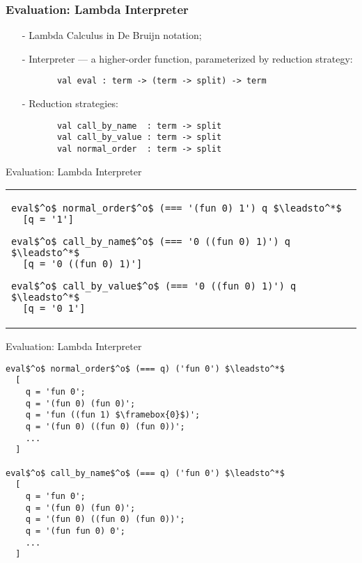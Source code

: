 \documentclass{beamer}
\theoremstyle{definition}
\begin{document}
\begin{frame}[fragile]\frametitle{Evaluation: Lambda Interpreter}
  \begin{itemize}
      \item[-] Lambda Calculus in De Bruijn notation;
      \vskip5mm
      \pause
      \item[-] Interpreter --- a higher-order function, parameterized by
               reduction strategy:
  \begin{lstlisting}
       val eval : term -> (term -> split) -> term
  \end{lstlisting}
  \pause
      \item[-] Reduction strategies:
  \begin{lstlisting}
       val call_by_name  : term -> split
       val call_by_value : term -> split
       val normal_order  : term -> split
  \end{lstlisting}
\end{itemize}
  
\end{frame}

\begin{frame}[fragile]{Evaluation: Lambda Interpreter}
\begin{tabular}{l}
\begin{lstlisting}[]
eval$^o$ normal_order$^o$ (=== '(fun 0) 1') q $\leadsto^*$
  [q = '1']
   
eval$^o$ call_by_name$^o$ (=== '0 ((fun 0) 1)') q $\leadsto^*$
  [q = '0 ((fun 0) 1)']   

eval$^o$ call_by_value$^o$ (=== '0 ((fun 0) 1)') q $\leadsto^*$
  [q = '0 1'] 
\end{lstlisting}
\end{tabular}

\end{frame}

\begin{frame}[fragile]{Evaluation: Lambda Interpreter}
\begin{lstlisting}
eval$^o$ normal_order$^o$ (=== q) ('fun 0') $\leadsto^*$ 
  [
    q = 'fun 0'; 
    q = '(fun 0) (fun 0)'; 
    q = 'fun ((fun 1) $\framebox{0}$)'; 
    q = '(fun 0) ((fun 0) (fun 0))';  
    ...
  ] 

eval$^o$ call_by_name$^o$ (=== q) ('fun 0') $\leadsto^*$ 
  [
    q = 'fun 0'; 
    q = '(fun 0) (fun 0)'; 
    q = '(fun 0) ((fun 0) (fun 0))'; 
    q = '(fun fun 0) 0'; 
    ...
  ] 
\end{lstlisting}
     
\end{frame}
\end{document}
